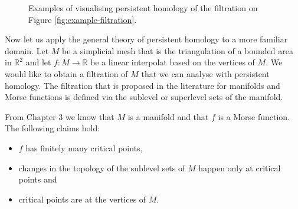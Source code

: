 \begin{figure}[h]
    \caption{Examples of visualising persistent homology of the filtration on Figure \ref{fig:example-filtration}.}%
    \label{fig:ph-viz}%
\end{figure}


Now let us apply the general theory of persistent homology to a more familiar domain. Let $M$ be a simplicial mesh that is the triangulation of a bounded area in $\mathbb{R}^2$ and let $f: M \to \mathbb{R}$ be a linear interpolat based on the vertices of $M$. We would like to obtain a filtration of $M$ that we can analyse with persistent homology. The filtration that is proposed in the literature \cite{comp-topo} for manifolds and Morse functions is defined via the sublevel or superlevel sets of the manifold.

From Chapter 3 we know that $M$ is a manifold and that $f$ is a Morse function. The following claims hold:

\begin{itemize}
    \item $f$ has finitely many critical points,
    \item changes in the topology of the sublevel sets of $M$ happen only at critical points and
    \item critical points are at the vertices of $M$.
\end{itemize}

